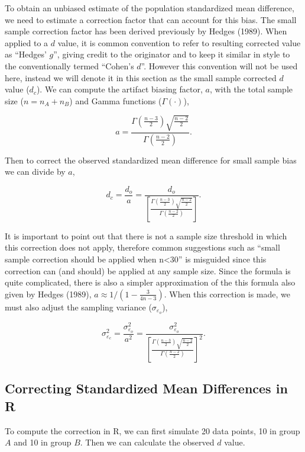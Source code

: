 \documentclass[
  letterpaper,
  DIV=11,
  numbers=noendperiod]{scrreprt}
\begin{document}
To obtain an unbiased estimate of the population standardized mean
difference, we need to estimate a correction factor that can account for
this bias. The small sample correction factor has been derived
previously by Hedges (1989). When applied to a \(d\) value, it is common
convention to refer to resulting corrected value as ``Hedges' \(g\)'',
giving credit to the originator and to keep it similar in style to the
conventionally termed ``Cohen's \(d\)''. However this convention will
not be used here, instead we will denote it in this section as the small
sample corrected \(d\) value (\(d_c\)). We can compute the artifact
biasing factor, \(a\), with the total sample size (\(n=n_A+n_B\)) and
Gamma functions (\(\Gamma(\cdot)\)),

\[
a = \frac{\Gamma\left(\frac{n-3}{2}\right)\sqrt{\frac{n-2}{2}}}{\Gamma\left(\frac{n-2}{2}\right)}.
\]

Then to correct the observed standardized mean difference for small
sample bias we can divide by \(a\),

\[
d_c = \frac{d_o}{a} = \frac{d_o}{ \left[\frac{\Gamma\left(\frac{n-3}{2}\right)\sqrt{\frac{n-2}{2}}}{\Gamma\left(\frac{n-2}{2}\right)}\right]}.
\]

It is important to point out that there is not a sample size threshold
in which this correction does not apply, therefore common suggestions
such as ``small sample correction should be applied when n\textless30''
is misguided since this correction can (and should) be applied at any
sample size. Since the formula is quite complicated, there is also a
simpler approximation of the this formula also given by Hedges (1989),
\(a\approx 1/\left(1-\frac{3}{4n-3}\right)\). When this correction is
made, we must also adjust the sampling variance
(\(\sigma_{\varepsilon_o}\)),

\[
\sigma^2_{\varepsilon_c} = \frac{\sigma^2_{\varepsilon_o}}{a^2} =\frac{\sigma^2_{\varepsilon_o}}{\left[\frac{\Gamma\left(\frac{n-3}{2}\right)\sqrt{\frac{n-2}{2}}}{\Gamma\left(\frac{n-2}{2}\right)}\right]^2}.
\]

\hypertarget{correcting-standardized-mean-differences-in-r}{%
\subsection{Correcting Standardized Mean Differences in
R}\label{correcting-standardized-mean-differences-in-r}}

To compute the correction in R, we can first simulate 20 data points, 10
in group \(A\) and 10 in group \(B\). Then we can calculate the observed
\(d\) value.
\end{document}
